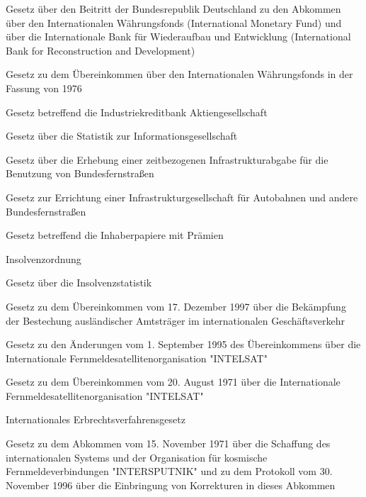 \item[{IMF-IBRDBeitrAbkG}] Gesetz über den Beitritt der Bundesrepublik Deutschland zu den Abkommen über den Internationalen Währungsfonds (International Monetary Fund) und über die Internationale Bank für Wiederaufbau und Entwicklung (International Bank for Reconstruction and Development)

\item[{IMFAbkG}] Gesetz zu dem Übereinkommen über den Internationalen Währungsfonds in der Fassung von 1976

\item[{IndKredBkG}] Gesetz betreffend die Industriekreditbank Aktiengesellschaft

\item[{InfoGesStatG}] Gesetz über die Statistik zur Informationsgesellschaft

\item[{InfrAG}] Gesetz über die Erhebung einer zeitbezogenen Infrastrukturabgabe für die Benutzung von Bundesfernstraßen

\item[{InfrGG}] Gesetz zur Errichtung einer Infrastrukturgesellschaft für Autobahnen und andere Bundesfernstraßen

\item[{InhPapG}] Gesetz betreffend die Inhaberpapiere mit Prämien

\item[{InsO}] Insolvenzordnung

\item[{InsStatG}] Gesetz über die Insolvenzstatistik

\item[{IntBestG}] Gesetz zu dem Übereinkommen vom 17. Dezember 1997 über die Bekämpfung der Bestechung ausländischer Amtsträger im internationalen Geschäftsverkehr

\item[{INTELSATÜbkÄndG}] Gesetz zu den Änderungen vom 1. September 1995 des Übereinkommens über die Internationale Fernmeldesatellitenorganisation "INTELSAT"

\item[{INTELSATÜbkG}] Gesetz zu dem Übereinkommen vom 20. August 1971 über die Internationale Fernmeldesatellitenorganisation "INTELSAT"

\item[{IntErbRVG}] Internationales Erbrechtsverfahrensgesetz

\item[{INTERSPUTNIKG}] Gesetz zu dem Abkommen vom 15. November 1971 über die Schaffung des internationalen Systems und der Organisation für kosmische Fernmeldeverbindungen "INTERSPUTNIK" und zu dem Protokoll vom 30. November 1996 über die Einbringung von Korrekturen in dieses Abkommen

